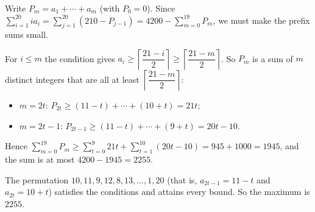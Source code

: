 Write $P_m=a_1+\cdots+a_m$ (with $P_0=0$). Since $\displaystyle\sum_{i=1}^{20}ia_i=\sum_{j=1}^{20}\left(210-P_{j-1}\right)=4200-\sum_{m=0}^{19}P_m$, we must make the prefix sums small.

For $i\le m$ the condition gives $a_i\ge\left\lceil\dfrac{21-i}{2}\right\rceil\ge\left\lceil\dfrac{21-m}{2}\right\rceil$. So $P_m$ is a sum of $m$ distinct integers that are all at least $\left\lceil\dfrac{21-m}{2}\right\rceil$:
\begin{itemize}
\item $m=2t$: $P_{2t}\ge(11-t)+\cdots+(10+t)=21t$;
\item $m=2t-1$: $P_{2t-1}\ge(11-t)+\cdots+(9+t)=20t-10$.
\end{itemize}
Hence $\displaystyle\sum_{m=0}^{19}P_m\ge\sum_{t=0}^{9}21t+\sum_{t=1}^{10}(20t-10)=945+1000=1945$, and the sum is at most $4200-1945=2255$.

The permutation $10,11,9,12,8,13,\dots,1,20$ (that is, $a_{2t-1}=11-t$ and $a_{2t}=10+t$) satisfies the conditions and attains every bound. So the maximum is $\boxed{2255}$.
